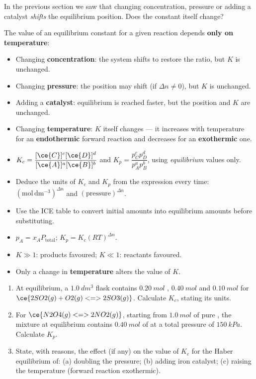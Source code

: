 \documentclass[11pt]{article}
\begin{document}
In the previous section we saw that changing concentration, pressure or adding a catalyst \emph{shifts} the equilibrium position. Does the constant itself change?

\begin{propriete}
The value of an equilibrium constant for a given reaction depends \textbf{only on temperature}:
\begin{itemize}
\item Changing \textbf{concentration}: the system shifts to restore the ratio, but $K$ is unchanged.
\item Changing \textbf{pressure}: the position may shift (if $\Delta n \neq 0$), but $K$ is unchanged.
\item Adding a \textbf{catalyst}: equilibrium is reached faster, but the position and $K$ are unchanged.
\item Changing \textbf{temperature}: $K$ itself changes --- it increases with temperature for an \textbf{endothermic} forward reaction and decreases for an \textbf{exothermic} one.
\end{itemize}
\end{propriete}

\begin{aretenir}
\begin{itemize}
\item $K_c=\dfrac{[\ce{C}]^c[\ce{D}]^d}{[\ce{A}]^a[\ce{B}]^b}$ and $K_p=\dfrac{p_C^{c}p_D^{d}}{p_A^{a}p_B^{b}}$, using \emph{equilibrium} values only.
\item Deduce the units of $K_c$ and $K_p$ from the expression every time: $(\mathrm{mol\,dm^{-3}})^{\Delta n}$ and $(\text{pressure})^{\Delta n}$.
\item Use the ICE table to convert initial amounts into equilibrium amounts before substituting.
\item $p_A = x_A P_{\text{total}}$; $K_p = K_c(RT)^{\Delta n}$.
\item $K\gg1$: products favoured; $K\ll1$: reactants favoured.
\item Only a change in \textbf{temperature} alters the value of $K$.
\end{itemize}
\end{aretenir}

\begin{exercice}[Practice]
\begin{enumerate}
\item At equilibrium, a $\SI{1.0}{dm^3}$ flask contains $\SI{0.20}{mol}$ , $\SI{0.40}{mol}$  and $\SI{0.10}{mol}$  for $\ce{2SO2(g) + O2(g) <=> 2SO3(g)}$. Calculate $K_c$, stating its units.
\item For $\ce{N2O4(g) <=> 2NO2(g)}$, starting from $\SI{1.0}{mol}$ of pure , the mixture at equilibrium contains $\SI{0.40}{mol}$ of  at a total pressure of $\SI{150}{kPa}$. Calculate $K_p$.
\item State, with reasons, the effect (if any) on the value of $K_c$ for the Haber equilibrium of: (a) doubling the pressure; (b) adding iron catalyst; (c) raising the temperature (forward reaction exothermic).
\end{enumerate}
\end{exercice}
\end{document}
